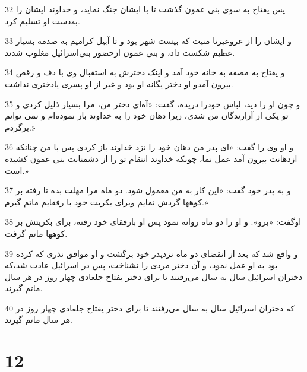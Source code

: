 \par 32 پس یفتاح به سوی بنی عمون گذشت تا با ایشان جنگ نماید، و خداوند ایشان را به‌دست او تسلیم کرد.
\par 33 و ایشان را از عروعیرتا منیت که بیست شهر بود و تا آبیل کرامیم به صدمه بسیار عظیم شکست داد، و بنی عمون ازحضور بنی‌اسرائیل مغلوب شدند.
\par 34 و یفتاح به مصفه به خانه خود آمد و اینک دخترش به استقبال وی با دف و رقص بیرون آمدو او دختر یگانه او بود و غیر از او پسری یادختری نداشت.
\par 35 و چون او را دید، لباس خودرا دریده، گفت: «آه‌ای دختر من، مرا بسیار ذلیل کردی و تو یکی از آزارندگان من شدی، زیرا دهان خود را به خداوند باز نموده‌ام و نمی توانم برگردم.»
\par 36 و او وی را گفت: «ای پدر من دهان خود را نزد خداوند باز کردی پس با من چنانکه ازدهانت بیرون آمد عمل نما، چونکه خداوند انتقام تو را از دشمنانت بنی عمون کشیده است.»
\par 37 و به پدر خود گفت: «این کار به من معمول شود. دو ماه مرا مهلت بده تا رفته بر کوهها گردش نمایم وبرای بکریت خود با رفقایم ماتم گیرم.»
\par 38 اوگفت: «برو». و او را دو ماه روانه نمود پس او بارفقای خود رفته، برای بکریتش بر کوهها ماتم گرفت.
\par 39 و واقع شد که بعد از انقضای دو ماه نزدپدر خود برگشت و او موافق نذری که کرده بود به او عمل نمود، و آن دختر مردی را نشناخت، پس در اسرائیل عادت شد،که دختران اسرائیل سال به سال می‌رفتند تا برای دختر یفتاح جلعادی چهار روز در هر سال ماتم گیرند.
\par 40 که دختران اسرائیل سال به سال می‌رفتند تا برای دختر یفتاح جلعادی چهار روز در هر سال ماتم گیرند.
 
\chapter{12}

